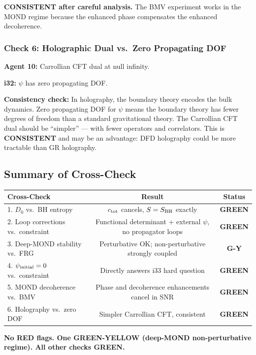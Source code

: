 \documentclass[11pt,a4paper]{article}
\newcommand{\GREEN}{\textcolor{dfdgreen}{\textbf{GREEN}}}
\newcommand{\GY}{\textcolor{dfdgy}{\textbf{G-Y}}}
\begin{document}
\textcolor{dfdgreen}{\textbf{CONSISTENT after careful analysis.}} The BMV experiment works in the MOND regime because the enhanced phase compensates the enhanced decoherence.

\subsubsection{Check 6: Holographic Dual vs.\ Zero Propagating DOF}

\textbf{Agent 10:} Carrollian CFT dual at null infinity.

\textbf{i32:} $\psi$ has zero propagating DOF.

\textbf{Consistency check:} In holography, the boundary theory encodes the bulk dynamics. Zero propagating DOF for $\psi$ means the boundary theory has fewer degrees of freedom than a standard gravitational theory. The Carrollian CFT dual should be ``simpler'' --- with fewer operators and correlators. This is \textcolor{dfdgreen}{\textbf{CONSISTENT}} and may be an advantage: DFD holography could be more tractable than GR holography.

\subsection{Summary of Cross-Check}

\begin{center}
\begin{tabular}{lcc}
\toprule
\textbf{Cross-Check} & \textbf{Result} & \textbf{Status} \\
\midrule
1. $D_0$ vs.\ BH entropy & $c_{\rm tot}$ cancels, $S = S_{\rm BH}$ exactly & \GREEN \\
2. Loop corrections vs.\ constraint & Functional determinant + external $\psi$, no propagator loops & \GREEN \\
3. Deep-MOND stability vs.\ FRG & Perturbative OK; non-perturbative strongly coupled & \GY \\
4. $\psi_{\rm initial} = 0$ vs.\ constraint & Directly answers i33 hard question & \GREEN \\
5. MOND decoherence vs.\ BMV & Phase and decoherence enhancements cancel in SNR & \GREEN \\
6. Holography vs.\ zero DOF & Simpler Carrollian CFT, consistent & \GREEN \\
\bottomrule
\end{tabular}
\end{center}

\textbf{No RED flags. One GREEN-YELLOW (deep-MOND non-perturbative regime). All other checks GREEN.}
\end{document}
